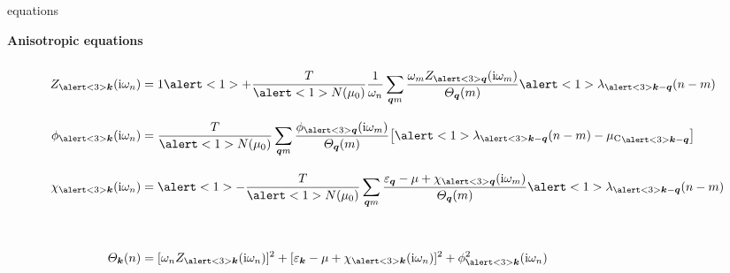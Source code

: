 \documentclass[10pt]{beamer}
\begin{document}
    \begin{frame}[label=Eliashberg2]{ equations}
        \begin{center} \bf
            Anisotropic equations
        \end{center}
        \begin{align*}
            Z_{\alert<3>{\vec k}}(\I \omega_n)
            &= 1 \alert<1>+ \frac T {\alert<1>{N(\mu_0)}} \frac 1 {\omega_n}
            \sum_{\vec q m} \frac
                {\omega_m Z_{\alert<3>{\vec q}}(\I \omega_m)}
                {\Theta_{\vec q}(m)}
            \alert<1>{\lambda_{\alert<3>{\vec k - \vec q}}(n - m)}
            \vspacing
            \\
            \phi_{\alert<3>{\vec k}}(\I \omega_n)
            &= \frac T {\alert<1>{N(\mu_0)}}
            \sum_{\vec q m} \frac
                {\phi_{\alert<3>{\vec q}}(\I \omega_m)}
                {\Theta_{\vec q}(m)}
            \big[
                \alert<1>{\lambda_{\alert<3>{\vec k - \vec q}}(n - m)
                - {\mu \sub C}_{\alert<3>{\vec k - \vec q}}}
            \big]
            \vspacing
            \\
            \chi_{\alert<3>{\vec k}}(\I \omega_n)
            &= \alert<1> -\frac T {\alert<1>{N(\mu_0)}}
            \sum_{\vec q m} \frac
                { \epsilon_{\vec q} - \mu
                + \chi_{\alert<3>{\vec q}}(\I \omega_m) }
                {\Theta_{\vec q}(m)}
            \alert<1>{\lambda_{\alert<3>{\vec k - \vec q}}(n - m)}
            \vspacing
            \\
            \hspace{2cm} & \hspace{8cm}
            \\
            \Theta_{\vec k}(n)
            &= [\omega_n Z_{\alert<3>{\vec k}}(\I \omega_n)]^2
            + [\epsilon_{\vec k} - \mu
            + \chi_{\alert<3>{\vec k}}(\I \omega_n)]^2
            + \phi^2_{\alert<3>{\vec k}}(\I \omega_n)
            \vspacing
        \end{align*}
    \end{frame}
\end{document}
